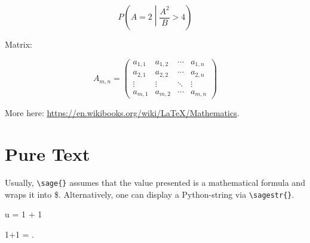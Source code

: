 \documentclass{article}
\begin{document}
$$P\left(A=2\middle|\frac{A^2}{B}>4\right)$$

Matrix:

\begin{equation*}
A_{m,n} =
 \begin{pmatrix}
  a_{1,1} & a_{1,2} & \cdots & a_{1,n} \\
  a_{2,1} & a_{2,2} & \cdots & a_{2,n} \\
  \vdots  & \vdots  & \ddots & \vdots  \\
  a_{m,1} & a_{m,2} & \cdots & a_{m,n}
 \end{pmatrix}
\end{equation*}

More here: \url{https://en.wikibooks.org/wiki/LaTeX/Mathematics}.

\section{Pure Text}

Usually, \verb|\sage{}| assumes that the value presented is
a mathematical formula and wraps it into \$.
Alternatively, one can display a Python-string via \verb|\sagestr{}|.

\begin{sagesilent}
u = 1 + 1
\end{sagesilent}

1+1 = .
\end{document}
